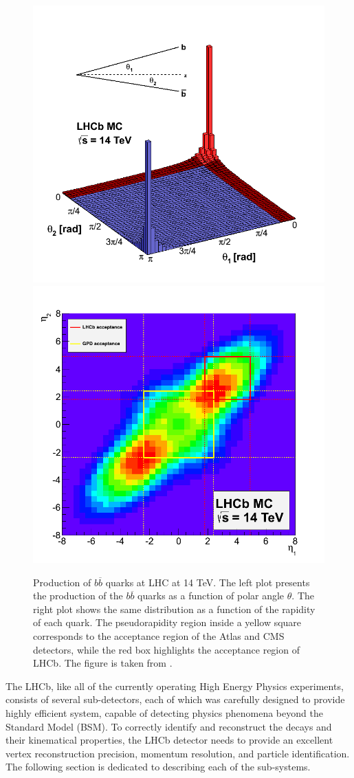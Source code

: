 \begin{figure}[h]
 \begin{center}
  \includegraphics[width=0.48\linewidth]{figures/bb_2.png}
   \includegraphics[width=0.48\linewidth]{figures/bb_1.png}
   \caption{Production of  $b \overline{b}$ quarks at LHC at 14 TeV. The left plot presents the production of the $b \overline{b}$ quarks as a function of polar angle $\theta$. The right plot shows the same distribution as a function of the rapidity of each quark. The pseudorapidity region inside a yellow square corresponds to the acceptance region of the Atlas and CMS detectors, while the red box highlights the acceptance region of LHCb. The figure is taken from \cite{bbangles}. 
     \label{fig:bb}}
 \end{center}
\end{figure}

The LHCb, like all of the currently operating High Energy Physics experiments, consists of several sub-detectors, each of which was carefully designed to provide highly efficient system, capable of detecting physics phenomena beyond the Standard Model (BSM). To correctly identify and reconstruct the decays and their kinematical properties, the LHCb detector needs to provide an excellent vertex reconstruction precision, momentum resolution, and particle identification. The following section is dedicated to describing each of the sub-systems.


